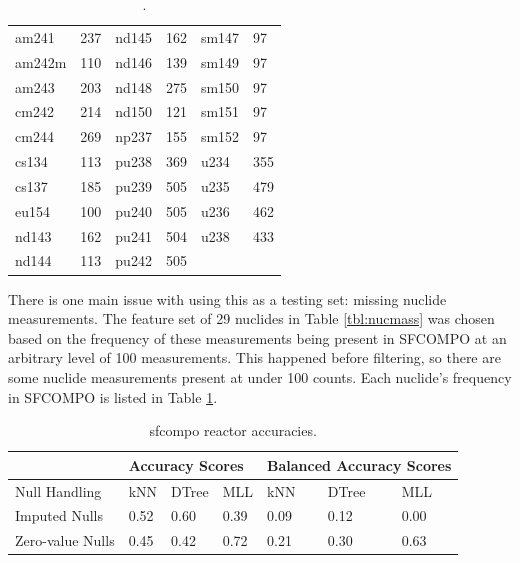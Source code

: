 \begin{table}[!ht]
  \centering
  \begin{tabular}{|>{\raggedleft}m{0.6in}
                                 m{0.4in}
                  |>{\raggedleft}m{0.6in}
                                 m{0.4in}
                  |>{\raggedleft}m{0.6in}
                                 m{0.4in}|}
    \toprule
    am241  & 237 & nd145 & 162 & sm147 & 97  \\
    am242m & 110 & nd146 & 139 & sm149 & 97  \\
    am243  & 203 & nd148 & 275 & sm150 & 97  \\
    cm242  & 214 & nd150 & 121 & sm151 & 97  \\
    cm244  & 269 & np237 & 155 & sm152 & 97  \\
    cs134  & 113 & pu238 & 369 & u234  & 355 \\
    cs137  & 185 & pu239 & 505 & u235  & 479 \\
    eu154  & 100 & pu240 & 505 & u236  & 462 \\
    nd143  & 162 & pu241 & 504 & u238  & 433 \\
    nd144  & 113 & pu242 & 505 &       &     \\ \bottomrule
  \end{tabular}
  \caption{.}
  \label{tbl:missing}
\end{table}

There is one main issue with using this as a testing set: missing nuclide
measurements.  The feature set of 29 nuclides in Table \ref{tbl:nucmass} was
chosen based on the frequency of these measurements being present in
\gls{SFCOMPO} at an arbitrary level of 100 measurements. This happened before
filtering, so there are some nuclide measurements present at under 100 counts.
Each nuclide's frequency in \gls{SFCOMPO} is listed in Table \ref{tbl:missing}.

\begin{table}[!ht]
  \centering
  \begin{tabular}{@{}l|lll|lll@{}}
    \toprule
                     & \multicolumn{3}{l|}{Accuracy Scores} & \multicolumn{3}{l}{Balanced Accuracy Scores} \\ \toprule
    Null Handling    & kNN        & DTree      & MLL       & kNN           & DTree         & MLL           \\ \midrule
    Imputed Nulls    & 0.52       & 0.60       & 0.39      & 0.09          & 0.12          & 0.00          \\
    Zero-value Nulls & 0.45       & 0.42       & 0.72      & 0.21          & 0.30          & 0.63          \\ \bottomrule
    \end{tabular}
  \caption{sfcompo reactor accuracies.}
  \label{tbl:sfcorxtr}
\end{table}

